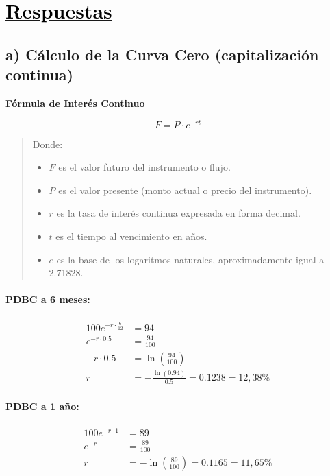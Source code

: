 \documentclass[12pt]{article}
\newcommand{\subrayadoRojo}[1]{{\color{rojoudp}\underline{\textcolor{black}{#1}}}}
\newcommand{\formulasection}[2]{%
    \vspace{1em}
    \noindent
    {\large\bfseries\color{blue}#1}\\[-4em]
    \begin{center}
        \large
      \[
      #2
      \]
    \end{center}
    \vspace{1em}
}
\begin{document}
\newpage

\section*{\subrayadoRojo{Respuestas}}

\subsection*{a) Cálculo de la Curva Cero (capitalización continua)}

\formulasection{Fórmula de Interés Continuo}{
    F = P \cdot e^{-rt}
}
\vspace{-3em}
\begin{quote}
    \scriptsize
Donde:
\begin{itemize}
    \item $F$ es el valor futuro del instrumento o flujo.
    \item $P$ es el valor presente (monto actual o precio del instrumento).
    \item $r$ es la tasa de interés continua expresada en forma decimal.
    \item $t$ es el tiempo al vencimiento en años.
    \item $e$ es la base de los logaritmos naturales, aproximadamente igual a 2.71828.
\end{itemize}
\end{quote}

\paragraph{PDBC a 6 meses:}
\begin{align*}
100 e^{-r \cdot \frac{6}{12}} &= 94 \\
e^{-r \cdot 0.5} &= \frac{94}{100} \\
-r \cdot 0.5 &= \ln\left(\frac{94}{100}\right) \\
r &= -\frac{\ln(0.94)}{0.5} = 0.1238 = 12{,}38\%
\end{align*}

\paragraph{PDBC a 1 año:}
\begin{align*}
100 e^{-r \cdot 1} &= 89 \\
e^{-r} &= \frac{89}{100} \\
r &= -\ln\left(\frac{89}{100}\right) = 0.1165 = 11{,}65\%
\end{align*}
\end{document}

